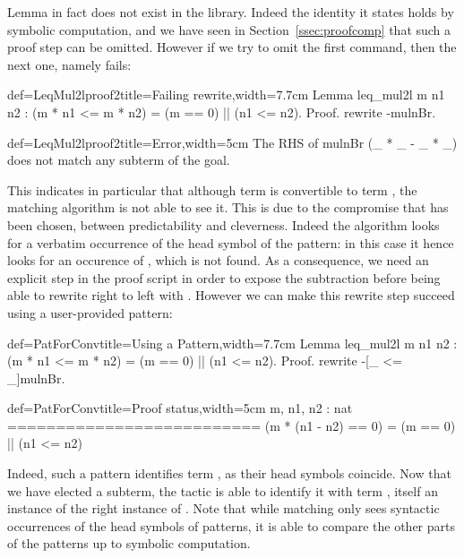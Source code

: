 Lemma  in fact does not exist in the library. Indeed the
identity it states holds by symbolic computation, and we have seen in
Section~\ref{ssec:proofcomp} that such a proof step can be omitted. However if we
try to omit the first  command, then the next one,
namely  fails:

\begin{coq}{def=LeqMul2lproof2}{title=Failing rewrite,width=7.7cm}
Lemma leq_mul2l m n1 n2 :
(m * n1 <= m * n2) = (m == 0) || (n1 <= n2).
Proof.
rewrite -mulnBr.
\end{coq}
\begin{coqout}{def=LeqMul2lproof2}{title=Error,width=5cm}
The RHS of mulnBr
  (_ * _ - _ * _)
does not match any subterm
of the goal.
\end{coqout}

This indicates in particular that although term 
is convertible to term , the matching
algorithm is not able to see it. This is due to the compromise that
has been chosen, between predictability and cleverness. Indeed the
algorithm looks for a verbatim occurrence of the head symbol of the
pattern: in this case it hence looks for an occurence of \C{(_ - _)},
which is not found. As a consequence, we need an explicit step in the
proof script in order to expose the subtraction before being able to
rewrite right to left with . However we can make this
rewrite step succeed using a user-provided pattern:

\begin{coq}{def=PatForConv}{title=Using a Pattern,width=7.7cm}
Lemma leq_mul2l m n1 n2 :
(m * n1 <= m * n2) = (m == 0) || (n1 <= n2).
Proof.
rewrite -[_ <= _]mulnBr.
\end{coq}
\begin{coqout}{def=PatForConv}{title=Proof status,width=5cm}
m, n1, n2 : nat
==========================
(m * (n1 - n2) == 0) =
(m == 0) || (n1 <= n2)
\end{coqout}

Indeed, such a pattern identifies term , as
their head symbols coincide. Now that we have elected a subterm, the
 tactic is able to identify it with term
, itself an instance of the right instance
of . Note that while matching only sees syntactic
occurrences of the
head symbols of patterns, it is able to compare the other parts of the
patterns up to symbolic computation.

